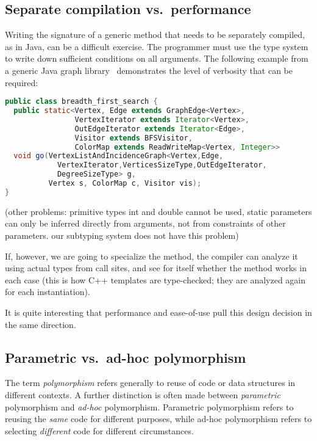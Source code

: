 \subsection{Separate compilation vs.\ performance}

Writing the signature of a generic method that needs to be separately compiled,
as in Java, can be a difficult exercise.
The programmer must use the type system to write down sufficient conditions on all
arguments.
The following example from a generic Java graph
library~\cite{Garcia:2003:CSL:949305.949317} demonstrates the level of verbosity
that can be required:

\begin{singlespace}
\begin{lstlisting}[language=java,style=ttcode]
public class breadth_first_search {
  public static<Vertex, Edge extends GraphEdge<Vertex>,
                VertexIterator extends Iterator<Vertex>,
                OutEdgeIterator extends Iterator<Edge>,
                Visitor extends BFSVisitor,
                ColorMap extends ReadWriteMap<Vertex, Integer>>
  void go(VertexListAndIncidenceGraph<Vertex,Edge,
            VertexIterator,VerticesSizeType,OutEdgeIterator,
            DegreeSizeType> g,
          Vertex s, ColorMap c, Visitor vis);
}
\end{lstlisting}
\end{singlespace}

(other problems: primitive types int and double cannot be used,
static parameters can only be inferred directly from arguments,
not from constraints of other parameters. our subtyping system
does not have this problem)

If, however, we are going to specialize the method, the compiler can analyze it
using actual types from call sites, and see for itself whether the method works
in each case (this is how C++ templates are type-checked; they are analyzed
again for each instantiation).

It is quite interesting that performance and ease-of-use pull this design
decision in the same direction.

\subsection{Parametric vs.\ ad-hoc polymorphism}

The term \emph{polymorphism} refers generally to reuse of code or data
structures in different contexts.
A further distinction is often made between \emph{parametric} polymorphism
and \emph{ad-hoc} polymorphism.
Parametric polymorphism refers to reusing the \emph{same} code for
different purposes, while ad-hoc polymorphism refers to selecting
\emph{different} code for different circumstances.


